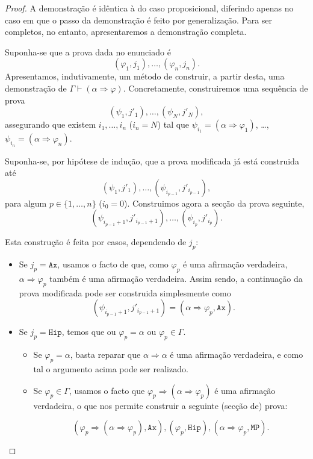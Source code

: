 \documentclass{report}
\theoremstyle{definition}
\theoremstyle{remark}
\newcommand{\imply}{\mathbin{\Rightarrow}}
\begin{document}
	\begin{proof}
	A demonstração é idêntica à do caso proposicional, diferindo apenas no caso em que o passo da demonstração é feito por generalização. Para ser completos, no entanto, apresentaremos a demonstração completa.
	
	Suponha-se que a prova dada no enunciado é
	\[(\varphi_1, j_1), \dots, (\varphi_n, j_n).\]
	Apresentamos, indutivamente, um método de construir, a partir desta, uma demonstração de $\Gamma \vdash (\alpha \imply \varphi)$. Concretamente, construiremos uma sequência de prova
	\[(\psi_1, j'_1), \dots, (\psi_N, j'_N),\]
	assegurando que existem $i_1, \dots, i_n$ ($i_n = N$) tal que $\psi_{i_1} = (\alpha \imply \varphi_1)$, \dots, $\psi_{i_n} = (\alpha \imply \varphi_n)$.
	
	Suponha-se, por hipótese de indução, que a prova modificada já está construida até
	\[(\psi_1, j'_1), \dots, (\psi_{i_{p-1}}, j'_{i_{p-1}}),\]
	para algum $p \in \{1, \dots, n\}$ ($i_0 = 0$). Construimos agora a secção da prova seguinte,
	\[(\psi_{i_{p-1}+1}, j'_{i_{p-1}+1}), \dots, (\psi_{i_p}, j'_{i_p}).\]
	
	Esta construção é feita por casos, dependendo de $j_p$:
	
	\begin{itemize}
	\item Se $j_p = \mathtt{Ax}$, usamos o facto de que, como $\varphi_p$ é uma afirmação verdadeira, $\alpha \imply \varphi_p$ também é uma afirmação verdadeira. Assim sendo, a continuação da prova modificada pode ser construida simplesmente como
	\[(\psi_{i_{p-1}+1}, j'_{i_{p-1}+1}) = (\alpha \imply \varphi_p, \mathtt{Ax}).\]
	
	\item Se $j_p = \mathtt{Hip}$, temos que ou $\varphi_p = \alpha$ ou $\varphi_p \in \Gamma$.
	
	\begin{itemize}
	\item Se $\varphi_p = \alpha$, basta reparar que $\alpha \imply \alpha$ é uma afirmação verdadeira, e como tal o argumento acima pode ser realizado.
	
	\item Se $\varphi_p \in \Gamma$, usamos o facto que $\varphi_p \imply (\alpha \imply \varphi_p)$ é uma afirmação verdadeira, o que nos permite construir a seguinte (secção de) prova:
	
	\[(\varphi_p \imply (\alpha \imply \varphi_p), \mathtt{Ax}), (\varphi_p, \mathtt{Hip}), (\alpha \imply \varphi_p, \mathtt{MP}).\]
	\end{itemize}
	

\end{itemize}
\end{proof}
\end{document}
